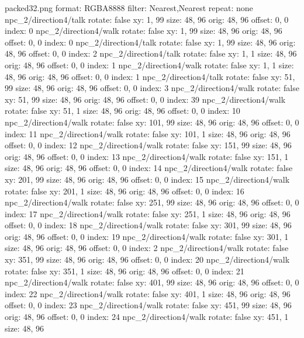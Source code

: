 packed32.png
format: RGBA8888
filter: Nearest,Nearest
repeat: none
npc_2/direction4/talk
  rotate: false
  xy: 1, 99
  size: 48, 96
  orig: 48, 96
  offset: 0, 0
  index: 0
npc_2/direction4/walk
  rotate: false
  xy: 1, 99
  size: 48, 96
  orig: 48, 96
  offset: 0, 0
  index: 0
npc_2/direction4/talk
  rotate: false
  xy: 1, 99
  size: 48, 96
  orig: 48, 96
  offset: 0, 0
  index: 2
npc_2/direction4/talk
  rotate: false
  xy: 1, 1
  size: 48, 96
  orig: 48, 96
  offset: 0, 0
  index: 1
npc_2/direction4/walk
  rotate: false
  xy: 1, 1
  size: 48, 96
  orig: 48, 96
  offset: 0, 0
  index: 1
npc_2/direction4/talk
  rotate: false
  xy: 51, 99
  size: 48, 96
  orig: 48, 96
  offset: 0, 0
  index: 3
npc_2/direction4/walk
  rotate: false
  xy: 51, 99
  size: 48, 96
  orig: 48, 96
  offset: 0, 0
  index: 39
npc_2/direction4/walk
  rotate: false
  xy: 51, 1
  size: 48, 96
  orig: 48, 96
  offset: 0, 0
  index: 10
npc_2/direction4/walk
  rotate: false
  xy: 101, 99
  size: 48, 96
  orig: 48, 96
  offset: 0, 0
  index: 11
npc_2/direction4/walk
  rotate: false
  xy: 101, 1
  size: 48, 96
  orig: 48, 96
  offset: 0, 0
  index: 12
npc_2/direction4/walk
  rotate: false
  xy: 151, 99
  size: 48, 96
  orig: 48, 96
  offset: 0, 0
  index: 13
npc_2/direction4/walk
  rotate: false
  xy: 151, 1
  size: 48, 96
  orig: 48, 96
  offset: 0, 0
  index: 14
npc_2/direction4/walk
  rotate: false
  xy: 201, 99
  size: 48, 96
  orig: 48, 96
  offset: 0, 0
  index: 15
npc_2/direction4/walk
  rotate: false
  xy: 201, 1
  size: 48, 96
  orig: 48, 96
  offset: 0, 0
  index: 16
npc_2/direction4/walk
  rotate: false
  xy: 251, 99
  size: 48, 96
  orig: 48, 96
  offset: 0, 0
  index: 17
npc_2/direction4/walk
  rotate: false
  xy: 251, 1
  size: 48, 96
  orig: 48, 96
  offset: 0, 0
  index: 18
npc_2/direction4/walk
  rotate: false
  xy: 301, 99
  size: 48, 96
  orig: 48, 96
  offset: 0, 0
  index: 19
npc_2/direction4/walk
  rotate: false
  xy: 301, 1
  size: 48, 96
  orig: 48, 96
  offset: 0, 0
  index: 2
npc_2/direction4/walk
  rotate: false
  xy: 351, 99
  size: 48, 96
  orig: 48, 96
  offset: 0, 0
  index: 20
npc_2/direction4/walk
  rotate: false
  xy: 351, 1
  size: 48, 96
  orig: 48, 96
  offset: 0, 0
  index: 21
npc_2/direction4/walk
  rotate: false
  xy: 401, 99
  size: 48, 96
  orig: 48, 96
  offset: 0, 0
  index: 22
npc_2/direction4/walk
  rotate: false
  xy: 401, 1
  size: 48, 96
  orig: 48, 96
  offset: 0, 0
  index: 23
npc_2/direction4/walk
  rotate: false
  xy: 451, 99
  size: 48, 96
  orig: 48, 96
  offset: 0, 0
  index: 24
npc_2/direction4/walk
  rotate: false
  xy: 451, 1
  size: 48, 96
